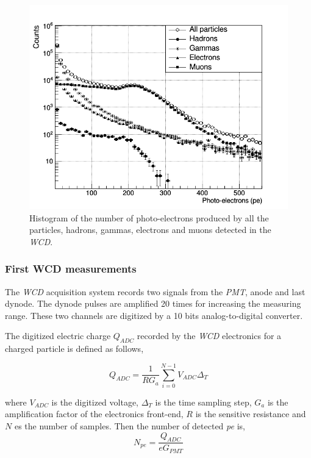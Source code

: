 \documentclass[submitting]{nst}
\begin{document}
\begin{figure}
    \centering
    \includegraphics[scale=0.4]{Figures/flux.png}
    \caption{Histogram of the number of photo-electrons produced by all the particles, hadrons, gammas, electrons and muons detected in the \textsl{WCD}.}
    \label{fig:flux}
\end{figure}

\subsubsection{First WCD measurements}\label{sec:wcd-data}%

The \textsl{WCD} acquisition system records two signals from the \textsl{PMT}, anode and last dynode. The dynode pulses are amplified 20 times for increasing the measuring range. These two channels are digitized by a 10 bits analog-to-digital converter.

The digitized electric charge $Q_{ADC}$ recorded by the \textsl{WCD} electronics for a charged particle is defined as follows,

\begin{equation}
\label{n_FE}
Q_{ADC} =  \frac{1}{RG_{a}}\sum_{i=0}^{N-1} V_{ADC} \Delta_T
\end{equation}

where $V_{ADC}$ is the digitized voltage, $\Delta_T$ is the time sampling step, $G_a$ is the amplification factor of the electronics front-end, $R$ is the sensitive resistance and $N$ es the number of samples. Then the number of detected \textsl{pe} is,
\begin{equation}
\label{n_FE}
N_{pe} = \frac{Q_{ADC}}{eG_{PMT}}
\end{equation}
\end{document}
